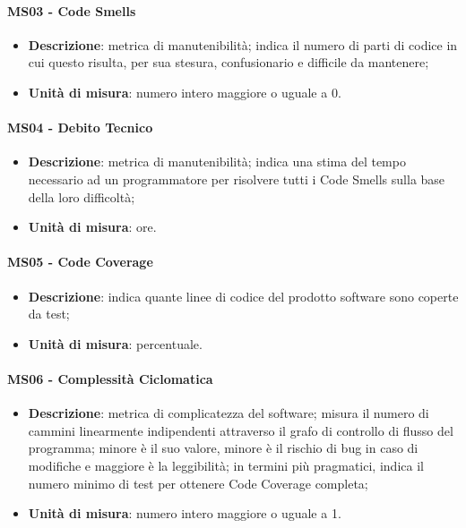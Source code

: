         \paragraph{MS03 - Code Smells}
        \begin{itemize}
            \item \textbf{Descrizione}: metrica di manutenibilità; indica il numero di parti di codice in cui questo risulta, per sua stesura, confusionario e difficile da mantenere;
            \item \textbf{Unità di misura}: numero intero maggiore o uguale a 0.
        \end{itemize}

        \paragraph{MS04 - Debito Tecnico}
        \begin{itemize}
            \item \textbf{Descrizione}: metrica di manutenibilità; indica una stima del tempo necessario ad un programmatore per risolvere tutti i Code Smells sulla base della loro difficoltà;
            \item \textbf{Unità di misura}: ore.
        \end{itemize}

        \paragraph{MS05 - Code Coverage}
        \begin{itemize}
            \item \textbf{Descrizione}: indica quante linee di codice del prodotto software sono coperte da test;
            \item \textbf{Unità di misura}: percentuale.
        \end{itemize}

        \paragraph{MS06 - Complessità Ciclomatica}
        \begin{itemize}
            \item \textbf{Descrizione}: metrica di complicatezza del software; misura il numero di cammini linearmente indipendenti attraverso il grafo di controllo di flusso del programma; minore è il suo valore, minore è il rischio di bug in caso di modifiche e maggiore è la leggibilità; in termini più pragmatici, indica il numero minimo di test per ottenere Code Coverage completa;
            \item \textbf{Unità di misura}: numero intero maggiore o uguale a 1.
        \end{itemize}

